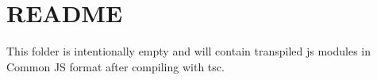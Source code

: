 \chapter{README}
\hypertarget{md_flatbuffers_2js_2README}{}\label{md_flatbuffers_2js_2README}
This folder is intentionally empty and will contain transpiled js modules in Common JS format after compiling with tsc. 